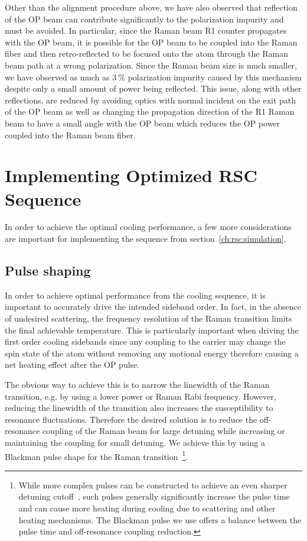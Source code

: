 Other than the alignment procedure above, we have also observed that reflection
of the OP beam can contribute significantly to the polarization impurity and
must be avoided. In particular, since the Raman beam R1 counter propagates with the OP beam,
it is possible for the OP beam to be coupled into the Raman fiber and then retro-reflected
to be focused onto the atom through the Raman beam path at a wrong polarization.
Since the Raman beam size is much smaller, we have observed as much as $3~\mathrm{\%}$
polarization impurity caused by this mechanism despite only a small amount of
power being reflected. This issue, along with other reflections,
are reduced by avoiding optics with normal incident on the exit path of the OP beam
as well as changing the propagation direction of the R1 Raman beam
to have a small angle with the OP beam which reduces the OP power coupled into
the Raman beam fiber.

\section{Implementing Optimized RSC Sequence}
\label{ch:rsc:implementation}

In order to achieve the optimal cooling performance, a few more considerations are important
for implementing the sequence from section~\ref{ch:rsc:simulation}.

\subsection{Pulse shaping}
\label{ch:rsc:implementation:pulse-shaping}

In order to achieve optimal performance from the cooling sequence,
it is important to accurately drive the intended sideband order.
In fact, in the absence of undesired scattering,
the frequency resolution of the Raman transition limits the final achievable temperature.
This is particularly important when driving the first order cooling sidebands
since any coupling to the carrier may change the spin state of the atom without
removing any motional energy therefore causing a net heating effect after the OP pulse.

The obvious way to achieve this is to narrow the linewidth of the Raman transition,
e.g. by using a lower power or Raman Rabi frequency.
However, reducing the linewidth of the transition also increases the susceptibility
to resonance fluctuations.
Therefore the desired solution is to reduce the off-resonance coupling of the Raman beam
for large detuning while increasing or maintaining the coupling for small detuning.
We achieve this by using a Blackman pulse shape for
the Raman transition~\cite{kasevich_laser_1992}\footnote{
  While more complex pulses can be constructed
  to achieve an even sharper detuning cutoff~\cite{fu_broadband_1995},
  such pulses generally significantly increase the pulse time
  and can cause more heating during cooling due to scattering and other heating mechanisms.
  The Blackman pulse we use offers a balance between the pulse time
  and off-resonance coupling reduction.}.

